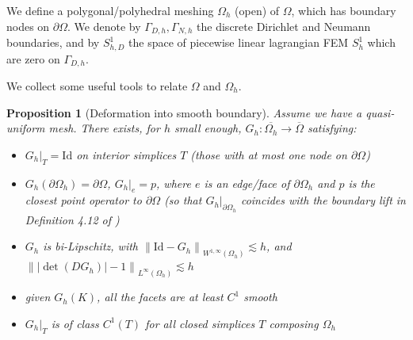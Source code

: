 \documentclass[english,a4paper,10pt,oneside]{scrbook}	%
\theoremstyle{break}
\newtheorem{prop}[equation]{Proposition}
\theoremstyle{remark}
\newcommand{\norm}[1]{\left\lVert#1\right\rVert}
\newcommand{\id}{\text{Id}}
\begin{document}
We define a polygonal/polyhedral meshing $\Omega_h$ (open) of $\Omega$, which has boundary nodes on $\partial \Omega$. We denote by $\Gamma_{D,h}, \Gamma_{N,h}$ the discrete Dirichlet and Neumann boundaries, and by $S^1_{h,D} $ the space of piecewise linear lagrangian FEM $S^1_h$ which are zero on $\Gamma_{D,h}$.

We collect some useful tools to relate $\Omega$ and $\Omega_h$.

\begin{prop}[Deformation into smooth boundary]
\label{prop:G_h}
Assume we have a quasi-uniform mesh. There exists, for $h$ small enough, $G_h: \overline{\Omega_h} \rightarrow \overline{\Omega}$ satisfying:

\begin{itemize}
	\item $G_h|_T = \id$ on interior simplices $T$ (those with at most one node on $\partial \Omega$)
	\item $G_h(\partial \Omega_h) = \partial \Omega$, $G_h|_e=p$, where $e$ is an edge/face of $\partial \Omega_h$ and $p$ is the closest point operator to $\partial \Omega$ (so that $G_h|_{\partial \Omega_h}$ coincides with the boundary lift in Definition 4.12 of \cite{elliott})
	\item $G_h$ is bi-Lipschitz, with $\norm{\id -G_h}_{W^{1,\infty}(\Omega_h)}\lesssim h$, and $\norm{|\det(DG_h)|-1}_{L^\infty(\Omega_h)}\lesssim h$
	\item given $G_h(K)$, all the facets are at least $C^1$ smooth
	\item $G_h|_T$ is of class $C^1(T)$ for all closed simplices $T$ composing $\Omega_h$
\end{itemize}

\end{prop}
\end{document}
